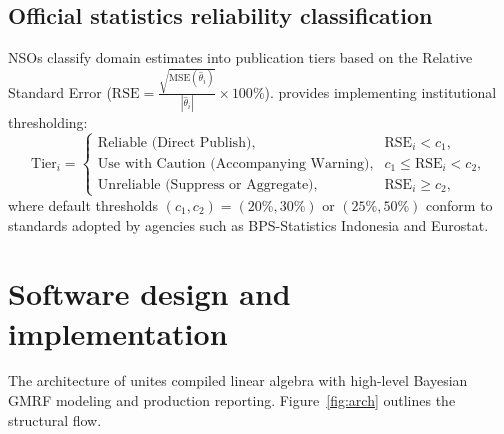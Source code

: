 \documentclass[article]{jss}
\begin{document}
\subsection{Official statistics reliability classification} \label{sec:methods_reliability}

NSOs classify domain estimates into publication tiers based on the Relative Standard Error ($\mathrm{RSE} = \frac{\sqrt{\mathrm{MSE}(\hat{\theta}_i)}}{|\hat{\theta}_i|} \times 100\%$).  provides  implementing institutional thresholding:
%
\begin{equation} \label{eq:reliability}
\mathrm{Tier}_i = \begin{cases}
\text{Reliable (Direct Publish)}, & \mathrm{RSE}_i < c_1, \\
\text{Use with Caution (Accompanying Warning)}, & c_1 \le \mathrm{RSE}_i < c_2, \\
\text{Unreliable (Suppress or Aggregate)}, & \mathrm{RSE}_i \ge c_2,
\end{cases}
\end{equation}
%
where default thresholds $(c_1, c_2) = (20\%, 30\%)$ or $(25\%, 50\%)$ conform to standards adopted by agencies such as BPS-Statistics Indonesia and Eurostat.


\section{Software design and implementation} \label{sec:design}

The architecture of  unites compiled linear algebra with high-level Bayesian GMRF modeling and production reporting. Figure~\ref{fig:arch} outlines the structural flow.
\end{document}
